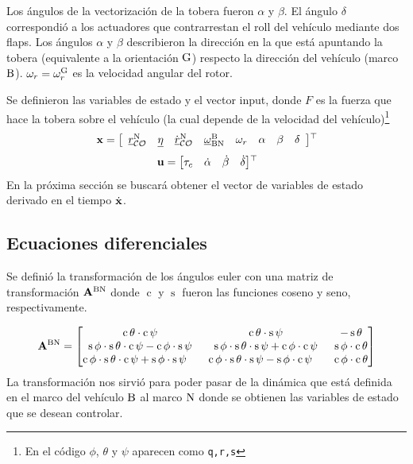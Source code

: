 Los ángulos de la vectorización de la tobera fueron $\alpha$ y $\beta$. El ángulo $\delta$ correspondió a los actuadores que contrarrestan el roll del vehículo mediante dos flaps. Los ángulos $\alpha$ y $\beta$ describieron la dirección en la que está apuntando la tobera (equivalente a la orientación $\mathrm{G}$) respecto la dirección del vehículo (marco $\mathrm{B}$). $\omega_r=\omega_r^{\mathrm{G}}$ es la velocidad angular del rotor.

\medskip

Se definieron las variables de estado y el vector input, donde $F$ es la fuerza que hace la tobera sobre el vehículo (la cual depende de la velocidad del vehículo)\footnote{En el código $\phi$, $\theta$ y $\psi$ aparecen como \texttt{q,r,s}}
\begin{equation} \label{eq:ssVariables3D}
	\mathbf{x} = \left[
	\begin{array}{cccccccc}
		{ \underline{r} }_{\mathcal{CO}}^{\mathrm{N}} & { \underline{\eta} } &\dot{{ \underline{r} }}_{\mathcal{CO}}^{\mathrm{N}} &  { \underline{\omega} }_{\mathrm{BN}}^{\mathrm{B}} & \omega_r & \alpha & \beta & \delta
	\end{array}\right] \!^{\top}\!
\end{equation}
\begin{equation}\label{eq:ssInputs3D}
	\mathbf{u} = \begin{bmatrix}
		\tau_c & \dot{\alpha} & \dot{\beta} & \dot{\delta}
	\end{bmatrix} \!^{\top}\!
\end{equation}
En la próxima sección se buscará obtener el vector de variables de estado derivado en el tiempo $\dot{\mathbf{x}}$.

\subsection{Ecuaciones diferenciales} \label{subsec:modeloMatematico}

\def\scos{\operatorname{c}}
\def\ssin{\operatorname{s}}
Se definió la transformación de los ángulos euler con una matriz de transformación $\mathbf{A}^{\mathrm{BN}}$ donde $\scos$ y $\ssin$ fueron las funciones coseno y seno, respectivamente.

\begin{equation} \label{eq:matrizTransfoVehiculo}
	\transform{BN} = \begin{bmatrix}
	\scos \theta \cdot \scos \psi & \scos \theta \cdot \ssin \psi & - \ssin \theta \\
	\ssin \phi \cdot \ssin \theta \cdot \scos \psi - \scos \phi \cdot \ssin \psi & \ssin\phi \cdot \ssin\theta \cdot \ssin\psi + \scos\phi\cdot\scos\psi & \ssin\phi \cdot \scos\theta \\
	\scos\phi \cdot \ssin\theta \cdot \scos\psi + \ssin\phi \cdot \ssin\psi\quad & \scos\phi \cdot \ssin\theta \cdot \ssin\psi - \ssin\phi \cdot \scos\psi \quad& \scos\phi \cdot \scos\theta
	\end{bmatrix}
\end{equation}
La transformación nos sirvió para poder pasar de la dinámica que está definida en el marco del vehículo $\mathrm{B}$ al marco $\mathrm{N}$ donde se obtienen las variables de estado que se desean controlar.


